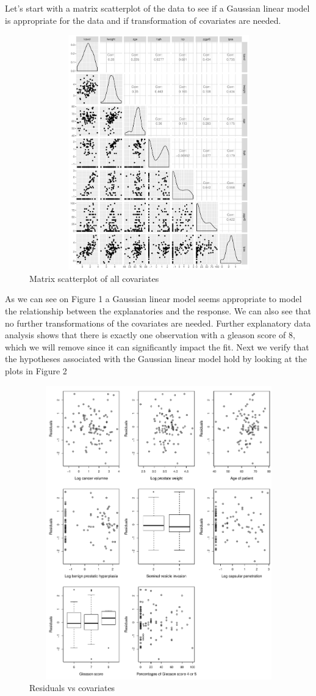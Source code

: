 \documentclass[11pt]{article}
\begin{document}
	Let's start with a matrix scatterplot of the data to see if a Gaussian linear model is appropriate for the data and if transformation of covariates are needed.

\begin{figure}[htb]
\begin{center}
\includegraphics[height=4in,width=5in]{matrixscatterplot.pdf}
\caption{Matrix scatterplot of all covariates}
\end{center}
\end{figure}
As we can see on Figure 1 a Gaussian linear model seems appropriate to model the relationship between the explanatories and the response. We can also see that no further transformations of the covariates are needed. Further explanatory data analysis shows that there is exactly one observation with a gleason score of 8, which we will remove since it can significantly impact the fit.
	Next we verify that the hypotheses associated with the Gaussian linear model hold by looking at the plots in Figure 2

\begin{figure}[htb]
\includegraphics[height=5in,width=5in]{plspls.pdf}
\caption{Residuals vs covariates}
\end{figure}
\end{document}
